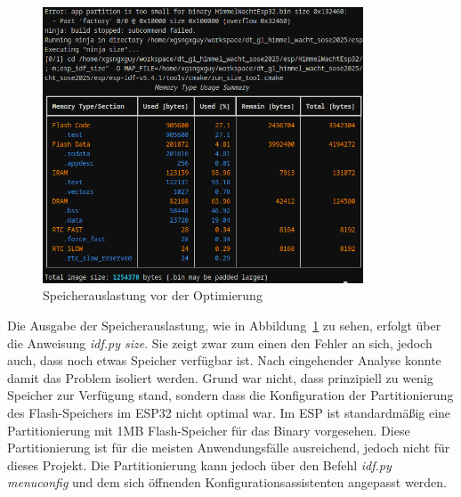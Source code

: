 \begin{figure}[H]
    \centering
    \includegraphics[width=0.85\textwidth]{images/memory_size_before.png}
    \caption{Speicherauslastung vor der Optimierung}
    \label{fig:memory_size_before}
\end{figure}

Die Ausgabe der Speicherauslastung, wie in Abbildung~\ref{fig:memory_size_before} zu sehen, erfolgt über die Anweisung \textit{idf.py size}. Sie zeigt zwar zum einen den Fehler an sich, jedoch auch, dass noch etwas Speicher verfügbar ist. Nach eingehender Analyse konnte damit das Problem isoliert werden. Grund war nicht, dass prinzipiell zu wenig Speicher zur Verfügung stand, sondern dass die Konfiguration der Partitionierung des Flash-Speichers im ESP32 nicht optimal war. Im ESP ist standardmäßig eine Partitionierung mit 1MB Flash-Speicher für das Binary vorgesehen. Diese Partitionierung ist für die meisten Anwendungsfälle ausreichend, jedoch nicht für dieses Projekt. Die Partitionierung kann jedoch über den Befehl \textit{idf.py menuconfig} und dem sich öffnenden Konfigurationsassistenten angepasst werden.

